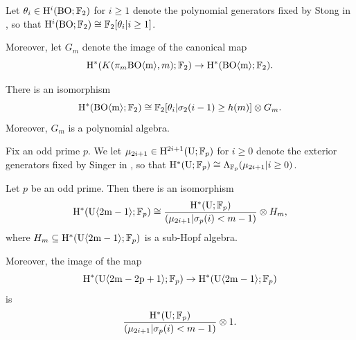 \begin{ntn}
    Let $\theta_i \in \mathrm{H}^i (\mathrm{BO}; \operatorname{\mathbb{F}}_2)$ for $i \geq 1$ denote the polynomial generators fixed by Stong in \cite{Stong}, so that $\mathrm{H}^i (\mathrm{BO}; \operatorname{\mathbb{F}}_2) \cong \operatorname{\mathbb{F}}_2 [\theta_i \vert i \geq 1]$.

    Moreover, let $G_m$ denote the image of the canonical map \[\mathrm{H}^*(K(\pi_m \mathrm{BO \langle m \rangle}, m); \operatorname{\mathbb{F}}_2) \to \mathrm{H}^* (\mathrm{BO \langle m \rangle}; \operatorname{\mathbb{F}}_2).\]
\end{ntn}

\begin{thm} \label{thm:BOmcoh2}
	There is an isomorphism
    \[\mathrm{H}^* (\mathrm{BO \langle m \rangle}; \operatorname{\mathbb{F}}_2) \cong \operatorname{\mathbb{F}}_2 [\theta_i \vert \sigma_2 (i-1) \geq h(m)] \otimes G_m.\] Moreover, $G_m$ is a polynomial algebra.
\end{thm}

\begin{ntn}
    Fix an odd prime $p$. We let $\mu_{2i +1} \in \mathrm{H}^{2i+1} (\mathrm{U}; \operatorname{\mathbb{F}}_p)$ for $i \geq 0$ denote the exterior generators fixed by Singer in \cite{Singer}, so that $\mathrm{H}^* (\mathrm{U}; \operatorname{\mathbb{F}}_p) \cong \Lambda_{\operatorname{\mathbb{F}}_p} (\mu_{2i+1} \vert i \geq 0)$.
\end{ntn}

\begin{thm}\label{thm:Umcohp}
    Let $p$ be an odd prime. Then there is an isomorphism \[\mathrm{H}^* (\mathrm{U}\mathrm{\langle 2m-1 \rangle}; \operatorname{\mathbb{F}}_p) \cong \frac{\mathrm{H}^{*} (\mathrm{U};\operatorname{\mathbb{F}}_p)}{(\mu_{2i+1} \vert \sigma_p (i) < m-1)} \otimes H_m,\] where $H_m \subseteq \mathrm{H}^* (\mathrm{U}\mathrm{\langle 2m-1 \rangle}; \operatorname{\mathbb{F}}_p)$ is a sub-Hopf algebra.

    Moreover, the image of the map \[\mathrm{H}^* (\mathrm{U}\mathrm{\langle 2m-2p+1\rangle}; \operatorname{\mathbb{F}}_p) \to \mathrm{H}^* (\mathrm{U}\mathrm{\langle 2m-1\rangle}; \operatorname{\mathbb{F}}_p)\] is \[\frac{\mathrm{H}^{*} (\mathrm{U};\operatorname{\mathbb{F}}_p)}{(\mu_{2i+1} \vert \sigma_p (i) < m-1)} \otimes 1.\]
\end{thm}

